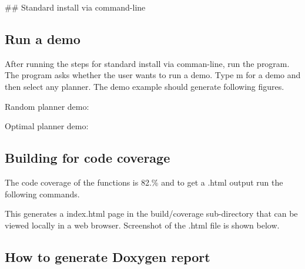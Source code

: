 \#\# Standard install via command-\/line 
\begin{DoxyCode}{0}
\end{DoxyCode}


\subsection*{Run a demo}

After running the steps for standard install via comman-\/line, run the program. The program asks whether the user wants to run a demo. Type \textquotesingle{}m\textquotesingle{} for a demo and then select any planner. The demo example should generate following figures.


\begin{DoxyEnumerate}
\item Random planner demo\+:
\end{DoxyEnumerate}

 


\begin{DoxyEnumerate}
\item Optimal planner demo\+:
\end{DoxyEnumerate}

 

\subsection*{Building for code coverage}

The code coverage of the functions is 82.\% and to get a .html output run the following commands. 
\begin{DoxyCode}{0}
\end{DoxyCode}
 This generates a index.\+html page in the build/coverage sub-\/directory that can be viewed locally in a web browser. Screenshot of the .html file is shown below.

 

\subsection*{How to generate Doxygen report}


